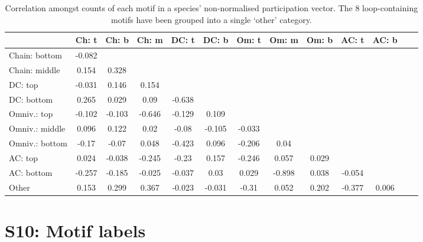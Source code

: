 \documentclass[12pt]{article}
\begin{document}
\begin{spacing}{2.0}
		\begin{table}[hb!]
    		\caption{Correlation amongst counts of each motif in a species' non-normalised participation vector. The 8 loop-containing motifs have been grouped into a single `other' category.}
    		\label{tab:position_Z_correlations}
    		\footnotesize
    		\begin{tabular}{l | c c c c c c c c c c c c}    
        		&	Ch: t	&	Ch: b	&	Ch: m	&	DC: t	&	DC: b	&	Om: t	&	Om: m	&	Om: b	&	AC: t	& AC: b\\
        		\hline
                Chain: bottom	&	-0.082	&		&		&		&		&		&		&		&		&		\\
                Chain: middle	&	0.154	&	0.328	&		&		&		&		&		&		&		&		\\
                DC: top	&	-0.031	&	0.146	&	0.154	&		&		&		&		&		&		&		\\
                DC: bottom	&	0.265	&	0.029	&	0.09	&	-0.638	&		&		&		&		&		&		\\
                Omniv.: top	&	-0.102	&	-0.103	&	-0.646	&	-0.129	&	0.109	&		&		&		&		&		\\
                Omniv.: middle	&	0.096	&	0.122	&	0.02	&	-0.08	&	-0.105	&	-0.033	&		&		&		&		\\
                Omniv.: bottom	&	-0.17	&	-0.07	&	0.048	&	-0.423	&	0.096	&	-0.206	&	0.04	&		&		&		\\
                AC: top	&	0.024	&	-0.038	&	-0.245	&	-0.23	&	0.157	&	-0.246	&	0.057	&	0.029	&		&		\\
                AC: bottom	&	-0.257	&	-0.185	&	-0.025	&	-0.037	&	0.03	&	0.029	&	-0.898	&	0.038	&	-0.054	&		\\
                Other	&	0.153	&	0.299	&	0.367	&	-0.023	&	-0.031	&	-0.31	&	0.052	&	0.202	&	-0.377	&	0.006	\\
            \hline
            \end{tabular}
            \end{table}


\clearpage

\section*{S10: Motif labels}


\end{spacing}
\end{document}
